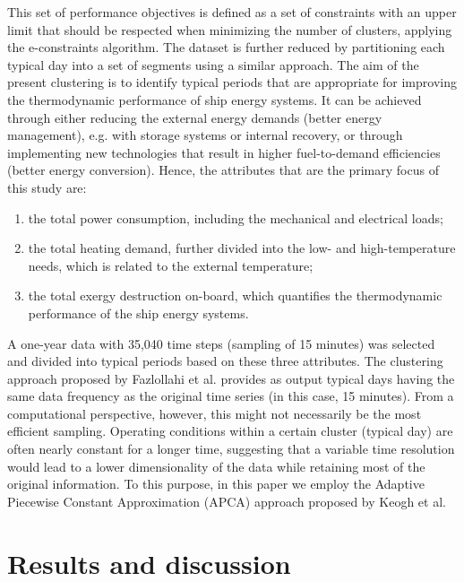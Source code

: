 \documentclass[preprint,12pt]{elsarticle}
\begin{document}
This set of performance objectives is defined as a set of constraints with an upper limit that should be respected when minimizing the number of clusters, applying the e-constraints algorithm. The dataset is further reduced by partitioning each typical day into a set of segments using a similar approach. 
The aim of the present clustering is to identify typical periods that are appropriate for improving the thermodynamic performance of ship energy systems. It can be achieved through either reducing the external energy demands (better energy management), e.g. with storage systems or internal recovery, or through implementing new technologies that result in higher fuel-to-demand efficiencies (better energy conversion). Hence, the attributes that are the primary focus of this study are: 
\begin{enumerate}
	\item the total power consumption, including the mechanical and electrical loads;
	\item the total heating demand, further divided into the low- and high-temperature needs, which is related to the external temperature; 
	\item the total exergy destruction on-board, which quantifies the thermodynamic performance of the ship energy systems.
\end{enumerate}
A one-year data with 35,040 time steps (sampling of 15 minutes) was selected and divided into typical periods based on these three attributes. 
The clustering approach proposed by Fazlollahi et al. \cite{Fazlollah2014} provides as output typical days having the same data frequency as the original time series (in this case, 15 minutes). From a computational perspective, however, this might not necessarily be the most efficient sampling. Operating conditions within a certain cluster (typical day) are often nearly constant for a longer time, suggesting that a variable time resolution would lead to a lower dimensionality of the data while retaining most of the original information. 
To this purpose, in this paper we employ the Adaptive Piecewise Constant Approximation (APCA) approach proposed by Keogh et al. \cite{Keogh2001}











\section{Results and discussion} \label{sec:results}
\end{document}
